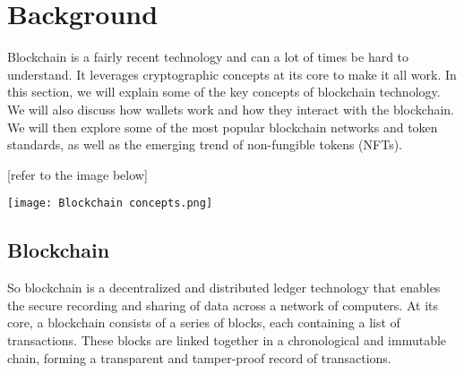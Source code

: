 \section{Background}

Blockchain is a fairly recent technology and can a lot of times be hard to understand. It leverages cryptographic concepts at its core to make it all work. In this section, we will explain some of the key concepts of blockchain technology. We will also discuss how wallets work and how they interact with the blockchain. We will then explore some of the most popular blockchain networks and token standards, as well as the emerging trend of non-fungible tokens (NFTs).

    [refer to the image below]

\texttt{[image: Blockchain concepts.png]}

\subsection{Blockchain}

So blockchain is a decentralized and distributed ledger technology that enables the secure recording and sharing of data across a network of computers. At its core, a blockchain consists of a series of blocks, each containing a list of transactions. These blocks are linked together in a chronological and immutable chain, forming a transparent and tamper-proof record of transactions.

~

